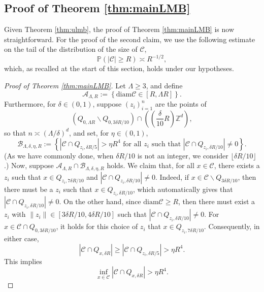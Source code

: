 \documentclass[11pt]{article}
\theoremstyle{definition}
\theoremstyle{remark}
\newcommand{\Z}{\mathbb{Z}}
\newcommand{\bP}{\mathbb{P}}
\numberwithin{equation}{section}
\theoremstyle{plain}
\theoremstyle{definition}
\theoremstyle{remark}
\theoremstyle{plain}
\begin{document}
\subsection{Proof of Theorem \ref{thm:mainLMB}}\label{proofsec2}

Given Theorem \ref{thm:ulmb}, the proof of Theorem \ref{thm:mainLMB} is now straightforward. For the proof of the second claim, we use the following estimate on the tail of the distribution of the size of $\mathcal{C}$,
\begin{equation}\label{voltail}
\bP\left(|\mathcal{C}|\geq R\right)\asymp R^{-1/2},
\end{equation}
which, as recalled at the start of this section, holds under our hypotheses.

\begin{proof}[Proof of Theorem \ref{thm:mainLMB}]
Let $\Lambda\geq 3$, and define
\[\mathcal{A}_{\Lambda,R}:=\left\{\mathrm{diam}\mathcal{C}\in[R,\Lambda R]\right\}.\]
Furthermore, for $\delta\in (0,1)$, suppose $(z_i)_{i=1}^n$ are the points of
\[\left(Q_{0,\Lambda R}\backslash Q_{0,3\delta R/10}\right)\cap\left(\left(\frac{\delta}{10}R\right)\Z^d\right),\]
so that $n\asymp (\Lambda/\delta)^d$, and set, for $\eta\in (0,1)$,
\[\mathcal{B}_{\Lambda,\delta,\eta,R}:=\left\{\left|\mathcal{C}\cap Q_{z_i,\delta R/5}\right|> \eta R^4\mbox{ for all $z_i$ such that }
\left|\mathcal{C}\cap Q_{z_i,\delta R/10}\right|\neq 0\right\}.\]
(As we have commonly done, when $\delta R/10$ is not an integer, we consider $\lfloor \delta R/10\rfloor$.) Now, suppose $\mathcal{A}_{\Lambda,R}\cap\mathcal{B}_{\Lambda,\delta,\eta,R}$ holds. We claim that, for all $x\in \mathcal{C}$, there exists a $z_i$ such that $x\in Q_{z_i,7\delta R/10}$ and $|\mathcal{C}\cap Q_{z_i,\delta R/10}|\neq 0$. Indeed, if $x\in \mathcal{C}\backslash Q_{3\delta R/10}$, then there must be a $z_i$ such that $x\in Q_{z_i,\delta R/10}$, which automatically gives that $|\mathcal{C}\cap Q_{z_i,\delta R/10}|\neq 0$. On the other hand, since $\mathrm{diam}\mathcal{C}\geq R$, then there must exist a $z_i$ with $\|z_i\|\in[3\delta R/10,4\delta R/10]$ such that $|\mathcal{C}\cap Q_{z_i,\delta R/10}|\neq 0$. For $x\in \mathcal{C}\cap Q_{0,3\delta R/10}$, it holds for this choice of $z_i$ that $x\in Q_{z_i,7\delta R/10}$. Consequently, in either case,
\[\left|\mathcal{C}\cap Q_{x,\delta R}\right|\geq \left|\mathcal{C}\cap Q_{z_i,\delta R/5}\right|>\eta R^4.\]
This implies
\[\inf_{x\in \mathcal{C}}\left|\mathcal{C}\cap Q_{x,\delta R}\right|>\eta R^4.\]


\end{proof}
\end{document}
